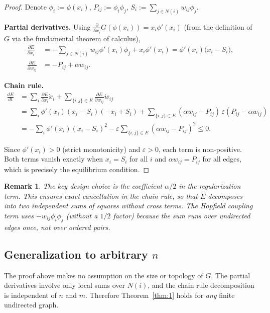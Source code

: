 \documentclass[3p]{elsarticle}
\newtheorem{remark}{Remark}
\newcommand{\eps}{\varepsilon}
\begin{document}
\begin{proof}
  Denote $\phi_i:=\phi(x_i)$, $P_{ij}:=\phi_i\phi_j$, $S_i:=\sum_{j\in N(i)} w_{ij}\phi_j$.

  \textbf{Partial derivatives.} Using $\frac{\partial}{\partial x_i}G(\phi(x_i)) = x_i\phi'(x_i)$ (from the definition of $G$ via the fundamental theorem of calculus),
  \begin{align*}
    \frac{\partial E}{\partial x_i}
      &= -\sum_{j\in N(i)} w_{ij}\phi'(x_i)\phi_j + x_i\phi'(x_i)
       = \phi'(x_i)\bigl(x_i - S_i\bigr),\\
    \frac{\partial E}{\partial w_{ij}}
      &= -P_{ij} + \alpha w_{ij}.
  \end{align*}

  \textbf{Chain rule.}
  \begin{align*}
    \frac{dE}{dt}
      &= \sum_i \frac{\partial E}{\partial x_i}\dot x_i + \sum_{\{i,j\}\in E} \frac{\partial E}{\partial w_{ij}}\dot w_{ij}\\
      &= \sum_i \phi'(x_i)(x_i - S_i)(-x_i + S_i)
         + \sum_{\{i,j\}\in E} (\alpha w_{ij} - P_{ij})\,\eps(P_{ij} - \alpha w_{ij})\\
      &= -\sum_i \phi'(x_i)(x_i - S_i)^2
         - \eps\sum_{\{i,j\}\in E} (\alpha w_{ij} - P_{ij})^2 \le 0.
  \end{align*}

  Since $\phi'(x_i)>0$ (strict monotonicity) and $\eps>0$, each term is non-positive. Both terms vanish exactly when $x_i=S_i$ for all $i$ and $\alpha w_{ij}=P_{ij}$ for all edges, which is precisely the equilibrium condition.
\end{proof}

\begin{remark}
  The key design choice is the coefficient $\alpha/2$ in the regularization term. This ensures exact cancellation in the chain rule, so that $\dot E$ decomposes into two independent sums of squares without cross terms. The Hopfield coupling term uses $-w_{ij}\phi_i\phi_j$ (without a $1/2$ factor) because the sum runs over undirected edges once, not over ordered pairs.
\end{remark}

\subsection{Generalization to arbitrary $n$}

The proof above makes no assumption on the size or topology of $G$. The partial derivatives involve only local sums over $N(i)$, and the chain rule decomposition is independent of $n$ and $m$. Therefore Theorem~\ref{thm:1} holds for \emph{any} finite undirected graph.
\end{document}
